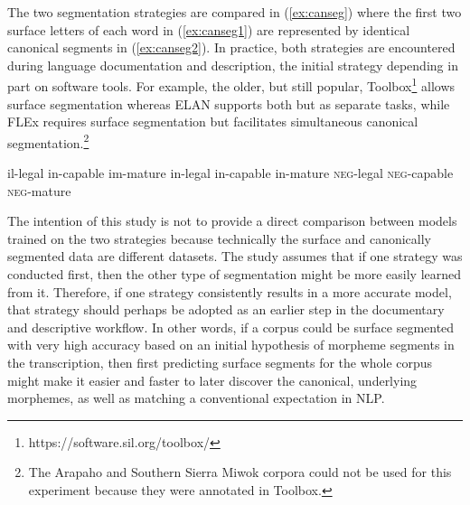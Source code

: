 The two segmentation strategies are compared in (\ref{ex:canseg}) where the first two surface letters of each word in (\ref{ex:canseg1}) are represented by identical canonical segments in (\ref{ex:canseg2}). In practice, both strategies are encountered during language documentation and description, the initial strategy depending in part on software tools. For example, the older, but still popular, Toolbox\footnote{https://software.sil.org/toolbox/} allows surface segmentation whereas ELAN \citep{auer_elan_2010} supports both but as separate tasks, while FLEx \citep{baines_overview_2018} requires surface segmentation but facilitates simultaneous canonical segmentation.\footnote{The Arapaho and Southern Sierra Miwok corpora could not be used for this experiment because they were annotated in Toolbox.}  


\pex   
\label{ex:canseg}
\a il-legal \hspace{6mm} in-capable \hspace{5mm} im-mature
\label{ex:canseg1}
\a in-legal \hspace{5mm} in-capable \hspace{5mm} in-mature
\label{ex:canseg2}
\a \textsc{neg}-legal \hspace{1mm} \textsc{neg}-capable \hspace{1mm} \textsc{neg}-mature
\label{ex:canseg3}
\xe


The intention of this study is not to provide a direct comparison between models trained on the two strategies because technically the surface and canonically segmented data are different datasets. The study assumes that if one strategy was conducted first, then the other type of segmentation might be more easily learned from it. Therefore, if one strategy consistently results in a more accurate model, that strategy should perhaps be adopted as an earlier step in the documentary and descriptive workflow. In other words, if a corpus could be surface segmented with very high accuracy based on an initial hypothesis of morpheme segments in the transcription, then first predicting surface segments for the whole corpus might make it easier and faster to later discover the canonical, underlying morphemes, as well as matching a conventional expectation in NLP. 

